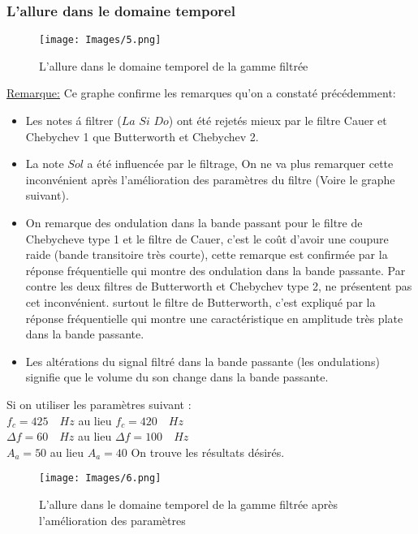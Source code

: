 \documentclass[twoside,twocolumn]{article}
\begin{document}
\subsubsection{L'allure dans le domaine temporel}
\begin{figure}[H]
\centering
\texttt{[image: Images/5.png]}
\caption{ L'allure dans le domaine temporel de la gamme filtrée}
\end{figure}

\underline{Remarque:}
Ce graphe confirme les remarques qu'on a constaté précédemment:
\begin{itemize}
\item
Les notes á filtrer ($La$ $Si$ $Do$) ont été rejetés mieux par le filtre Cauer et Chebychev 1 que Butterworth et Chebychev 2.
\item
La note $Sol$ a été influencée par le filtrage, On ne va plus remarquer cette inconvénient   après l'amélioration des paramètres du filtre (Voire le graphe suivant).
\item 
On remarque des ondulation dans la bande passant pour le filtre de Chebycheve type 1 et le filtre de Cauer, c'est le coût d'avoir une coupure raide (bande transitoire très courte), cette remarque est confirmée par la réponse fréquentielle qui montre des ondulation dans la bande passante.
Par contre les deux filtres de Butterworth et Chebychev type 2, ne présentent pas cet inconvénient. surtout le filtre de Butterworth, c'est expliqué par la réponse fréquentielle qui montre une caractéristique en amplitude très plate dans la bande passante.
\item Les altérations du signal filtré dans la bande passante (les ondulations) signifie que le volume du son change dans la bande passante.

\end{itemize}
Si on utiliser les paramètres suivant :\\
 $f_c = 425\quad Hz$  \quad au lieu  \quad $f_c = 420\quad Hz$ \\
$\Delta f = 60\quad Hz$ \quad au lieu \quad $\Delta f = 100\quad Hz$ \\
$A_a = 50$ \quad au lieu \quad $A_a = 40$
 On trouve les résultats désirés.
 
\begin{figure}[H]
\centering
\texttt{[image: Images/6.png]}
\caption{ L'allure dans le domaine temporel de la gamme filtrée après l'amélioration des paramètres}
\end{figure}
\end{document}
